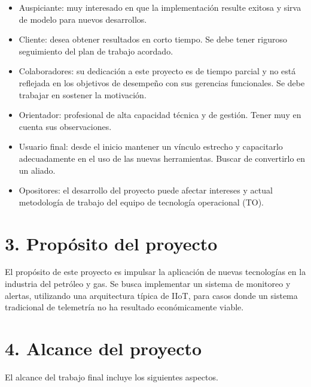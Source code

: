 \documentclass[
11pt, %
]{charter}
\begin{document}
\begin{itemize}
	\item Auspiciante: muy interesado en que la implementación resulte exitosa y sirva de modelo para nuevos desarrollos.
	\item Cliente: desea obtener resultados en corto tiempo. Se debe tener riguroso seguimiento del plan de trabajo acordado.
	\item Colaboradores: su dedicación a este proyecto es de tiempo parcial y no está reflejada en los objetivos de desempeño con sus gerencias funcionales. Se debe trabajar en sostener la motivación.
	\item Orientador: profesional de alta capacidad técnica y de gestión. Tener muy en cuenta sus observaciones.
	\item Usuario final: desde el inicio mantener un vínculo estrecho y capacitarlo adecuadamente en el uso de las nuevas herramientas. Buscar de convertirlo en un aliado.
	\item Opositores: el desarrollo del proyecto puede afectar intereses y actual metodología de trabajo del equipo de tecnología operacional (TO).
\end{itemize}




\section{3. Propósito del proyecto}
\label{sec:proposito}

El propósito de este proyecto es impulsar la aplicación de nuevas tecnologías en la industria del petróleo y gas. Se busca implementar un sistema de monitoreo y alertas, utilizando una arquitectura típica de IIoT, para casos donde un sistema tradicional de telemetría no ha resultado económicamente viable.


\section{4. Alcance del proyecto}
\label{sec:alcance}

El alcance del trabajo final incluye los siguientes aspectos.
\end{document}
